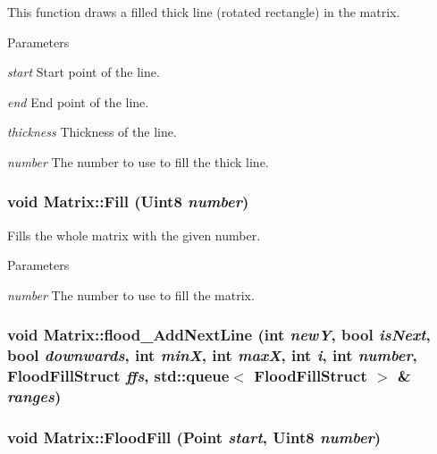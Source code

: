 This function draws a filled thick line (rotated rectangle) in the matrix. 


\begin{DoxyParams}{Parameters}
\item[{\em start}]Start point of the line. \item[{\em end}]End point of the line. \item[{\em thickness}]Thickness of the line. \item[{\em number}]The number to use to fill the thick line. \end{DoxyParams}
\hypertarget{classMatrix_a4a7c3875be94e94786db920c441973e6}{
\subsubsection[{Fill}]{\setlength{\rightskip}{0pt plus 5cm}void Matrix::Fill (Uint8 {\em number})}}
\label{classMatrix_a4a7c3875be94e94786db920c441973e6}


Fills the whole matrix with the given number. 


\begin{DoxyParams}{Parameters}
\item[{\em number}]The number to use to fill the matrix. \end{DoxyParams}
\hypertarget{classMatrix_aaa3962d9bf27f654bd6771a8d5bfaeac}{
\subsubsection[{flood\_\-AddNextLine}]{\setlength{\rightskip}{0pt plus 5cm}void Matrix::flood\_\-AddNextLine (int {\em newY}, \/  bool {\em isNext}, \/  bool {\em downwards}, \/  int {\em minX}, \/  int {\em maxX}, \/  int {\em i}, \/  int {\em number}, \/  {\bf FloodFillStruct} {\em ffs}, \/  std::queue$<$ {\bf FloodFillStruct} $>$ \& {\em ranges})}}
\label{classMatrix_aaa3962d9bf27f654bd6771a8d5bfaeac}
\hypertarget{classMatrix_a7209ed0123ff3686f0d0f7f4e6ac7094}{
\subsubsection[{FloodFill}]{\setlength{\rightskip}{0pt plus 5cm}void Matrix::FloodFill ({\bf Point} {\em start}, \/  Uint8 {\em number})}}
\label{classMatrix_a7209ed0123ff3686f0d0f7f4e6ac7094}


